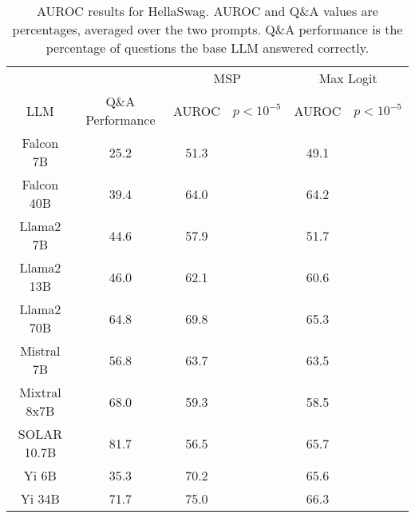 \begin{table*}
\centering
\begin{tabular}{c|c|c|c|c|c}
& & \multicolumn{2}{c|}{MSP} & \multicolumn{2}{c}{Max Logit} \\ 
LLM & Q\&A Performance & AUROC & $p < 10^{-5}$ & AUROC & $p < 10^{-5}$\\ \hline
Falcon 7B & 25.2 & 51.3 &  & 49.1 & \\
Falcon 40B & 39.4 & 64.0 &  & 64.2 & \\
Llama2 7B & 44.6 & 57.9 &  & 51.7 & \\
Llama2 13B & 46.0 & 62.1 &  & 60.6 & \\
Llama2 70B & 64.8 & 69.8 &  & 65.3 & \\
Mistral 7B & 56.8 & 63.7 &  & 63.5 & \\
Mixtral 8x7B & 68.0 & 59.3 &  & 58.5 & \\
SOLAR 10.7B & 81.7 & 56.5 &  & 65.7 & \\
Yi 6B & 35.3 & 70.2 &  & 65.6 & \\
Yi 34B & 71.7 & 75.0 &  & 66.3 & \\
\hline
\end{tabular}
\caption{AUROC results for HellaSwag. AUROC and Q\&A values are percentages, averaged over the two prompts. Q\&A performance is the percentage of questions the base LLM answered correctly.}
\label{tab:hellaswag_auroc}
\end{table*}
